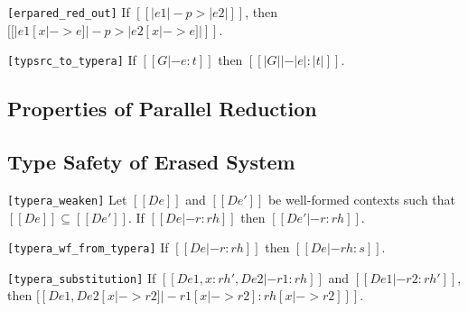 \begin{lemma}
\verb|[erpared_red_out]| If $[[|e1| -p> |e2|]]$, then
  $[[|e1 [x |-> e]| -p> |e2 [x |-> e]| ]]$.
\end{lemma}

\begin{lemma}
  \verb|[typsrc_to_typera]| If $[[G |- e : t]]$ then
  $[[|G| |- |e| : |t|]]$.
\end{lemma}

\subsection{Properties of Parallel Reduction}



\subsection{Type Safety of Erased System}
\begin{lemma}[Weakening]
    \verb|[typera_weaken]|
    Let $[[De]]$ and $[[De']]$ be well-formed contexts such that $[[De]] \subseteq
[[De']]$. If $[[De |- r : rh]]$ then $[[De' |- r : rh]]$.
\end{lemma}

\begin{lemma}
\verb|[typera_wf_from_typera]|
    If $[[De |- r:rh]]$ then $[[De |- rh : s]]$.
\end{lemma}

\begin{lemma}[Substitution]
\verb|[typera_substitution]|
  If $[[De1, x:rh', De2 |- r1:rh]]$ and $[[De1 |- r2:rh']]$, then
  $[[De1, De2 [x |-> r2] |- r1[x |-> r2] : rh[x |-> r2] ]]$.
\end{lemma}

